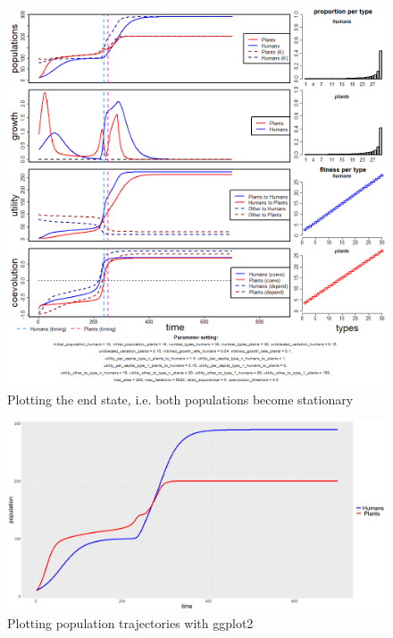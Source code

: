 \documentclass[
]{book}
\begin{document}
\newpage

\begin{figure}
\includegraphics[width=1\linewidth]{plots/1_singleRun_coevolution-sameTiming_defaultPlot} \caption{Plotting the end state, i.e. both populations become stationary}\label{fig:1runcoevolutionsametimingdefaultplot}
\end{figure}

\newpage

\begin{figure}
\includegraphics[width=1\linewidth]{plots/1_singleRun_coevolution-sameTiming_ggplot} \caption{Plotting population trajectories with ggplot2}\label{fig:1runcoevolutionsametimingggplotprint}
\end{figure}
\end{document}
